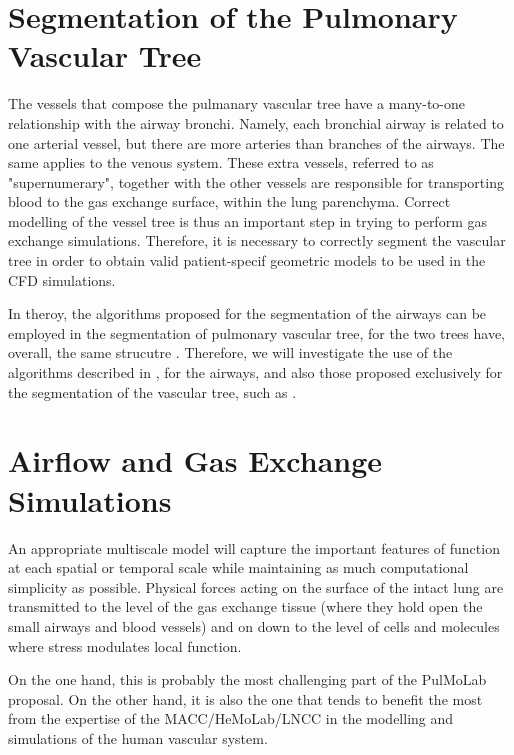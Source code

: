 \section{Segmentation of the Pulmonary Vascular Tree}

\challenge

The vessels that compose the pulmanary vascular tree have a many-to-one relationship with the airway bronchi. Namely, each bronchial airway is related to one arterial vessel, but there are more arteries than branches of the airways. The same applies to the venous system. These extra vessels, referred to as "supernumerary", together with the other vessels are responsible for transporting blood to the gas exchange surface, within the lung parenchyma. Correct modelling of the vessel tree is thus an important step in trying to perform gas exchange simulations. Therefore, it is necessary to correctly segment the vascular tree in order to obtain valid patient-specif geometric models to be used in the CFD simulations. 

\approach

In theroy, the algorithms proposed for the segmentation of the airways can be employed in the segmentation of pulmonary vascular tree, for the two trees have, overall, the same strucutre \citep{TawhaiM2011}. Therefore, we will investigate the use of the algorithms described in \citep{Lo}, for the airways, and also those proposed exclusively for the segmentation of the vascular tree, such as \citep{Dongen,Ebrahimdoost,Gutierrez,Linguraru,Shikata,Wala}.


\section{Airflow and Gas Exchange Simulations}

\challenge

An appropriate multiscale model will capture the important features of function at each spatial or temporal scale while maintaining as much computational simplicity as possible. Physical forces acting on the surface of the intact lung are transmitted to the level of the gas exchange tissue (where they hold open the small airways and blood vessels) and on down to the level of cells and molecules where stress modulates local function.

On the one hand, this is probably the most challenging part of the PulMoLab proposal. On the other hand, it is also the one that tends to benefit the most from the expertise of the MACC/HeMoLab/LNCC in the modelling and simulations of the human vascular system. 


